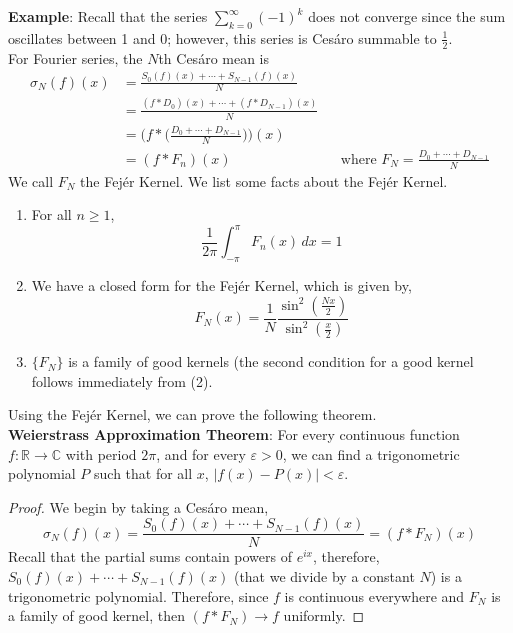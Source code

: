 \documentclass[12pt]{article}
\begin{document}
\noindent \textbf{Example}: Recall that the series $\sum^\infty_{k=0}(-1)^k$ does not converge since the sum oscillates between 1 and 0; however, this series is Ces\'aro summable to $\frac{1}{2}$. \\

\noindent For Fourier series, the $N$th Ces\'aro mean is
\begin{align*}
\sigma_N(f)(x) &= \frac{S_0(f)(x)+ \cdots + S_{N-1}(f)(x)}{N} \\
&= \frac{(f*D_0)(x) + \cdots + (f*D_{N-1})(x)}{N} \\
&= \Big(f*\Big(\frac{D_0+ \cdots + D_{N-1}}{N}\Big)\Big)(x) \\
&= (f*F_n)(x) && \text{where } F_N =\frac{D_0 + \cdots + D_{N-1}}{N} 
\end{align*}
\noindent We call $F_N$ the Fej\'er Kernel. We list some facts about the Fej\'er Kernel. \\

\begin{enumerate}[itemsep=0pt, topsep=0pt, parsep=0pt, partopsep=0pt] 
\item For all $n\geq 1$,
$$\frac{1}{2\pi} \int^{\pi}_{-\pi} F_n(x) \, dx = 1$$
\item We have a closed form for the Fej\'er Kernel, which is given by,
$$F_N(x) = \frac{1}{N} \frac{\sin^2(\frac{Nx}{2})}{\sin^2(\frac{x}{2})}$$
\item $\{F_N\}$ is a family of good kernels (the second condition for a good kernel follows immediately from (2). 
\end{enumerate}
\noindent Using the Fej\'er Kernel, we can prove the following theorem. \\

\noindent \textbf{Weierstrass Approximation Theorem}: For every continuous function $f: \mathbb{R} \rightarrow \mathbb{C}$ with period $2\pi$, and for every $\varepsilon>0$, we can find a trigonometric polynomial $P$ such that for all $x$, $\vert f(x) - P(x)\vert < \varepsilon$. 

\begin{proof}
We begin by taking a Ces\'aro mean,
$$\sigma_N(f)(x) = \frac{S_0(f)(x) + \cdots + S_{N-1}(f)(x)}{N} = (f * F_N)(x)$$
\noindent Recall that the partial sums contain powers of $e^{ix}$, therefore, $S_0(f)(x) + \cdots + S_{N-1}(f)(x)$ (that we divide by a constant $N$) is a trigonometric polynomial. Therefore, since $f$ is continuous everywhere and $F_N$ is a family of good kernel, then $(f*F_N) \rightarrow f$ uniformly. 
\end{proof}
\end{document}
